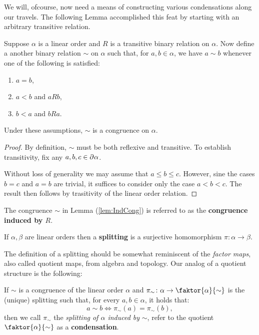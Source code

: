 We will, ofcourse, now need a means of constructing various condensations along
our travels.  The following Lemma accomplished this feat by starting with an
arbitrary transitive relation.

\begin{lem}
	\label{lem:IndCong}
	Suppose $\alpha$ is a linear order and $R$ is a transitive binary relation
	on $\alpha$.  Now define a another binary relation $\sim$ on $\alpha$ such
	that, for $a,b\in\alpha$, we have $a\sim b$ whenever one of the following
	is satisfied:
	\begin{enumerate}
		\item   $a=b$,
		\item   $a<b$ and $aRb$,
		\item   $b<a$ and $bRa$.
	\end{enumerate}
	Under these assumptions, $\sim$ is a congruence on $\alpha$.
\end{lem}
\begin{proof}
	By definition, $\sim$ must be both reflexive and transitive.  To establish
	transitivity, fix any $a,b,c\in\partial^{}\alpha$.

	Without loss of generality we may assume that $a\leq b\leq c$.  However,
	sine the cases $b=c$ and $a=b$ are trivial, it suffices to consider only the
	case $a<b<c$.  The result then follows by trasitivity of the linear order
	relation.
\end{proof}

\begin{dfn}
	The congruence $\sim$ in Lemma (\ref{lem:IndCong}) is referred to as the
	\textbf{congruence induced by $R$}.
\end{dfn}

\begin{dfn}[Splitting]
	If $\alpha,\beta$ are linear orders then a \textbf{splitting} is a
	surjective homomorphism $\pi\colon\alpha\rightarrow\beta$.
\end{dfn}

The definition of a splitting should be somewhat reminiscent of the
\textit{factor maps}, also called quotient maps, from algebra and topology.  Our
analog of a quotient structure is the following:

\begin{dfn}[Condensations]
	If $\sim$ is a congruence of the linear order $\alpha$ and
	$\pi_\sim\colon\alpha\to\faktor{\alpha}{\sim}$ is the (unique) splitting such
	that, for every $a,b\in\alpha$, it holds that:
	\begin{equation}
		a\sim b\iff\pi_\sim(a)=\pi_\sim(b),
	\end{equation}
	then we call $\pi_\sim$ the \textit{splitting of $\alpha$ induced
	by} $\sim$, refer to the quotient $\faktor{\alpha}{\sim}$ as a
	\textbf{condensation}.
\end{dfn}

